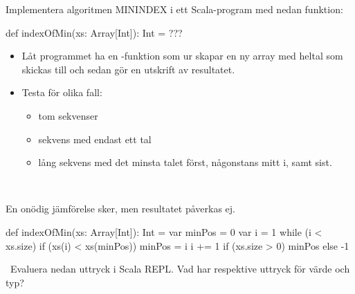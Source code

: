 \Subtask Implementera algoritmen MININDEX i ett Scala-program med nedan funktion:
\begin{Code}
def indexOfMin(xs: Array[Int]): Int = ???
\end{Code}
\begin{itemize}
  \item Låt programmet ha en -funktion som ur  skapar en ny array med heltal som skickas till  och sedan gör en utskrift av resultatet.
  \item Testa för olika fall:
  \begin{itemize}
    \item tom sekvenser
    \item sekvens med endast ett tal
    \item lång sekvens med det minsta talet först, någonstans mitt i, samt sist.
  \end{itemize}
\end{itemize}


\SOLUTION

\TaskSolved \what~

\SubtaskSolved En onödig jämförelse sker, men resultatet påverkas ej.

\SubtaskSolved

\begin{Code}
def indexOfMin(xs: Array[Int]): Int = {
  var minPos = 0
  var i = 1
  while (i < xs.size) {
    if (xs(i) < xs(minPos)) minPos = i
    i += 1
  }
  if (xs.size > 0) minPos else -1
}
\end{Code}


\QUESTEND






\QUESTBEGIN

\Task  \what~Evaluera nedan uttryck i Scala REPL. Vad har respektive uttryck för värde och typ?

\Subtask {}

\Subtask {}

\Subtask {}

\Subtask {}

\Subtask {}

\Subtask {}

\Subtask {}

\Subtask {}


